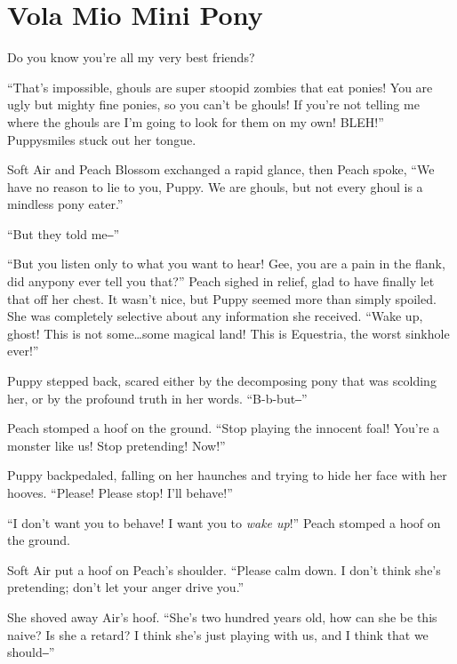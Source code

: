 
\chapter{Vola Mio Mini Pony}


\begin{intro}
Do you know you're all my very best friends?
\end{intro}



``That's impossible, ghouls are super stoopid zombies that eat ponies! You are ugly but mighty fine ponies, so you can't be ghouls! If you're not telling me where the ghouls are I'm going to look for them on my own! BLEH!'' Puppysmiles stuck out her tongue.

Soft Air and Peach Blossom exchanged a rapid glance, then Peach spoke, ``We have no reason to lie to you, Puppy. We are ghouls, but not every ghoul is a mindless pony eater.''

``But they told me‒''

``But you listen only to what you want to hear! Gee, you are a pain in the flank, did anypony ever tell you that?'' Peach sighed in relief, glad to have finally let that off her chest. It wasn't nice, but Puppy seemed more than simply spoiled. She was completely selective about any information she received. ``Wake up, ghost! This is not some\dots some magical land! This is Equestria, the worst sinkhole ever!''

Puppy stepped back, scared either by the decomposing pony that was scolding her, or by the profound truth in her words. ``B-b-but‒''

Peach stomped a hoof on the ground. ``Stop playing the innocent foal! You're a monster like us! Stop pretending! Now!''

Puppy backpedaled, falling on her haunches and trying to hide her face with her hooves. ``Please! Please stop! I'll behave!''

``I don't want you to behave! I want you to \emph{wake up}!'' Peach stomped a hoof on the ground.

Soft Air put a hoof on Peach's shoulder. ``Please calm down. I don't think she's pretending; don't let your anger drive you.''

She shoved away Air's hoof. ``She's two hundred years old, how can she be this naive? Is she a retard? I think she's just playing with us, and I think that we should‒''

